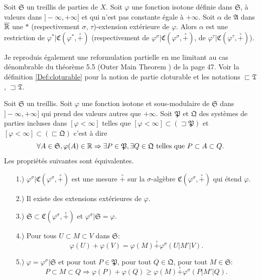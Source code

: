 \begin{thm}
 Soit $\mathfrak{S}$ un treillis de parties de $X$. Soit $\varphi$ une fonction isotone définie dans $\mathfrak{S}$, à valeurs dans $]- \infty, + \infty]$ et qui n'est pas constante égale à $+\infty$.\newline
 Soit $\alpha$ de $\mathfrak{A}$ dans $\overline{\mathbb{R}}$ une $*$ (respectivement $\sigma$, $\tau$)-extension extérieure de $\varphi$. Alors $\alpha$ est une restriction de $\varphi^*|\mathfrak{C}(\varphi^*,\overset{\circ}{+})$ (respectivement de $\varphi^\sigma|\mathfrak{C}(\varphi^\sigma,\overset{\circ}{+})$, de $\varphi^\tau|\mathfrak{C}(\varphi^\tau,\overset{\circ}{+})$).
\end{thm}
Je reproduis également une reformulation partielle en me limitant au cas dénombrable du théorème 5.5 (\og Outer Main Theorem \fg) de la page 47. Voir la définition \ref{Def:cloturable} pour la notion de partie cloturable et les notations $\sqsubset \mathfrak{T}$, $\sqsupset \mathfrak{T}$.
\begin{thmn}
 Soit $\mathfrak{S}$ un treillis. Soit $\varphi$ une fonction isotone et sous-modulaire de $\mathfrak{S}$ dans $]-\infty , +\infty]$ qui prend des valeurs autres que $+\infty$.\newline
 Soit $\mathfrak{P}$ et $\mathfrak{Q}$ des systèmes de parties incluses dans $[\varphi < \infty]$ telles que $[\varphi < \infty] \subset (\sqsupset \mathfrak{P})$ et $[\varphi < \infty] \subset (\sqsubset \mathfrak{Q})$ c'est à dire
 \begin{displaymath}
  \forall A \in \mathfrak{S}, \varphi(A)\in \mathbb{R} \Rightarrow \exists P \in \mathfrak{P}, \exists Q \in \mathfrak{Q} \text{ telles que } P \subset A \subset Q.
 \end{displaymath}
 Les propriétés suivantes sont équivalentes.
 \begin{itemize}
  \item[1.)] $\varphi^\sigma | \mathfrak{C}(\varphi^\sigma, \overset{\circ}{+})$ est une mesure $\overset{\circ}{+}$ sur la $\sigma$-algèbre $\mathfrak{C}(\varphi^\sigma, \overset{\circ}{+})$ qui étend $\varphi$.
  \item [2.)] Il existe des extensions extérieures de $\varphi$.
  \item [3.)] $\mathfrak{S} \subset \mathfrak{C}(\varphi^\sigma, \overset{\circ}{+})$ et $\varphi^\sigma |\mathfrak{S} = \varphi$.
  \item [4.)] Pour tous $U \subset M \subset V$ dans $\mathfrak{S}$:
  \begin{displaymath}
   \varphi(U) + \varphi(V) = \varphi(M) \overset{\circ}{+} \varphi^\sigma(U | M' | V).
  \end{displaymath}
  \item [5.)] $\varphi = \varphi^\sigma|\mathfrak{S}$ et pour tout $P \in \mathfrak{P}$, pour tout $Q \in \mathfrak{Q}$, pour tout $M \in \mathfrak{S}$:
  \begin{displaymath}
   P \subset M \subset Q \Rightarrow
   \varphi(P) + \varphi(Q) \geq \varphi(M) \overset{\circ}{+} \varphi^\sigma(P | M' | Q).
  \end{displaymath}
 \end{itemize}
\end{thmn}
